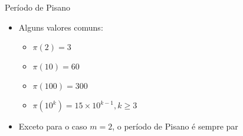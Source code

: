 \begin{frame}[fragile]{Período de Pisano}

    \begin{itemize}
        \item Alguns valores comuns:
        \begin{itemize}
            \item $\pi(2) = 3$
            \item $\pi(10) = 60$
            \item $\pi(100) = 300$
            \item $\pi(10^k) = 15 \times 10^{k - 1}, k \geq 3$
        \end{itemize}

        \item Exceto para o caso $m = 2$, o período de Pisano é sempre par
    \end{itemize}

\end{frame}
